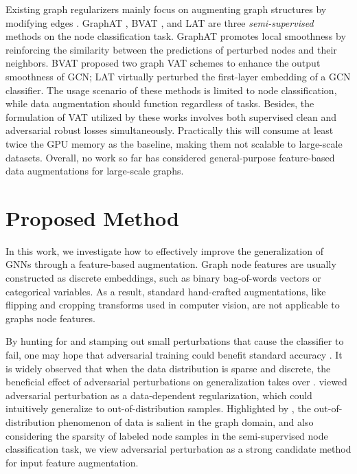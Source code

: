\documentclass[11pt]{article}
\begin{document}
Existing graph regularizers mainly focus on augmenting graph structures by modifying edges \citep{rong2019dropedge,hamilton2017inductive,chen2018fastgcn}. GraphAT \citep{feng2019graph}, BVAT \citep{deng2019batch}, and LAT \citep{jin2019latent} are three \textit{semi-supervised} methods on the node classification task. GraphAT promotes local smoothness by reinforcing the similarity between the predictions of perturbed nodes and their neighbors. BVAT proposed two graph VAT schemes to enhance the output smoothness of GCN; LAT virtually perturbed the first-layer embedding of a GCN classifier. The usage scenario of these methods is limited to node classification, while data augmentation should function regardless of tasks. Besides, the formulation of VAT \citep{miyato2018virtual} utilized by these works involves both supervised clean and adversarial robust losses simultaneously. Practically this will consume at least twice the GPU memory as the baseline, making them not scalable to large-scale datasets. Overall, no work so far has considered general-purpose feature-based data augmentations for large-scale graphs.

%
 \section{Proposed Method}

In this work, we investigate how to effectively improve the generalization of GNNs through a feature-based augmentation. Graph node features are usually constructed as discrete embeddings, such as binary bag-of-words vectors or categorical variables.  As a result, standard hand-crafted augmentations, like flipping and cropping transforms used in computer vision, are not applicable to graphs node features.   



By hunting for and stamping out small perturbations that cause the classifier to fail, one may hope that adversarial training could benefit standard accuracy \citep{goodfellow2014explaining,tsipras2018robustness,miyato2018virtual}. It is widely observed that when the data distribution is sparse and discrete, the beneficial effect of adversarial perturbations on generalization takes over \citep{tsipras2018robustness,gan2020large}. \citet{volpi2018generalizing} viewed adversarial perturbation as a data-dependent regularization, which could intuitively generalize to out-of-distribution samples. Highlighted by \citet{hu2020open}, the out-of-distribution phenomenon of data is salient in the graph domain, and also considering the sparsity of labeled node samples in the semi-supervised node classification task, we view adversarial perturbation as a strong candidate method for input feature augmentation.
\end{document}
